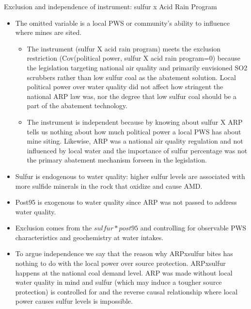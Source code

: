 \documentclass{beamer}
\begin{document}
\begin{frame}{Exclusion and independence of instrument: sulfur x Acid Rain Program}
    \begin{itemize}
    \item The omitted variable is a local PWS or community's ability to influence where mines are sited. 
    \begin{itemize}
        \item The instrument (sulfur X acid rain program) meets the exclusion restriction (Cov(political power, sulfur X acid rain program=0) because the legislation targeting national air quality and primarily envisioned SO2 scrubbers rather than low sulfur coal as the abatement solution. Local political power over water quality did not affect how stringent the national ARP law was, nor the degree that low sulfur coal should be a part of the abatement technology.
        \item The instrument is independent because by knowing about sulfur X ARP tells us nothing about how much political power a local PWS has about mine siting. Likewise, ARP was a national air quality regulation and not influenced by local water and the importance of sulfur percentage was not the primary abatement mechanism forseen in the legislation.
    \end{itemize}
        \item Sulfur is endogenous to water quality: higher sulfur levels are associated with more sulfide minerals in the rock that oxidize and cause AMD.
        \item Post95 is exogenous to water quality since ARP was not passed to address water quality.
        \item Exclusion comes from the $sulfur*post95$ and controlling for observable PWS characteristics and geochemistry at water intakes.
    \end{itemize}
    \begin{itemize}
        \item To argue independence we say that the reason why ARPxsulfur bites has nothing to do with the local power over source protection. ARPxsulfur happens at the national coal demand level. ARP was made without local water quality in mind and sulfur (which may induce a tougher source protection) is controlled for and the reverse causal relationship where local power causes sulfur levels is impossible.
    \end{itemize}
\end{frame}
\end{document}
